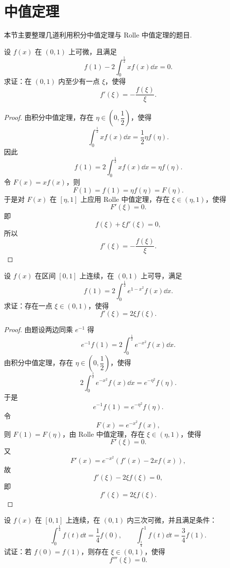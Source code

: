 \section{中值定理}

本节主要整理几道利用积分中值定理与 Rolle 中值定理的题目.

\begin{problem}
 设 $f(x)$ 在 $(0,1)$ 上可微，且满足
	\[
	f(1)-2\int_0^{\frac12}x f(x)\dd x=0.
	\]
	求证：在 $(0,1)$ 内至少有一点 $\xi$，使得
	\[
	f'(\xi)=-\frac{f(\xi)}{\xi}.
	\]
\end{problem}

\begin{proof}
	由积分中值定理，存在 $\eta\in\left(0,\dfrac12\right)$，使得
	\[
	\int_0^{\frac12}x f(x)\dd x=\frac12\eta f(\eta).
	\]
	因此
	\[
	f(1)=2\int_0^{\frac12}x f(x)\dd x=\eta f(\eta).
	\]
	令 $F(x)=x f(x)$，则
	\[
	F(1)=f(1)=\eta f(\eta)=F(\eta).
	\]
	于是对 $F(x)$ 在 $[\eta,1]$ 上应用 Rolle 中值定理，存在 $\xi\in(\eta,1)$，使得
	\[
	F'(\xi)=0.
	\]
	即
	\[
	f(\xi)+\xi f'(\xi)=0,
	\]
	所以
	\[
	f'(\xi)=-\frac{f(\xi)}{\xi}.
	\]
\end{proof}

\begin{problem}
设 $f(x)$ 在区间 $[0,1]$ 上连续，在 $(0,1)$ 上可导，满足
	\[
	f(1)=2\int_0^{\frac12}e^{1-x^2}f(x)\dd x.
	\]
	求证：存在一点 $\xi\in(0,1)$，使得
	\[
	f'(\xi)=2\xi f(\xi).
	\]
\end{problem}

\begin{proof}
	由题设两边同乘 $e^{-1}$ 得
	\[
	e^{-1}f(1)=2\int_0^{\frac12}e^{-x^2}f(x)\dd x.
	\]
	由积分中值定理，存在 $\eta\in\left(0,\dfrac12\right)$，使得
	\[
	2\int_0^{\frac12}e^{-x^2}f(x)\dd x=e^{-\eta^2}f(\eta).
	\]
	于是
	\[
	e^{-1}f(1)=e^{-\eta^2}f(\eta).
	\]
	令
	\[
	F(x)=e^{-x^2}f(x),
	\]
	则 $F(1)=F(\eta)$，由 Rolle 中值定理，存在 $\xi\in(\eta,1)$，使得
	\[
	F'(\xi)=0.
	\]
	又
	\[
	F'(x)=e^{-x^2}\left(f'(x)-2x f(x)\right),
	\]
	故
	\[
	f'(\xi)-2\xi f(\xi)=0,
	\]
	即
	\[
	f'(\xi)=2\xi f(\xi).
	\]
\end{proof}

\begin{problem}
设 $f(x)$ 在 $[0,1]$ 上连续，在 $(0,1)$ 内三次可微，并且满足条件：
	\[
	\int_0^{\frac14}f(t)\dd t=\frac14 f(0),
	\qquad
	\int_{\frac14}^{1}f(t)\dd t=\frac34 f(1).
	\]
	试证：若 $f(0)=f(1)$，则存在 $\xi\in(0,1)$，使得
	\[
	f'''(\xi)=0.
	\]
\end{problem}

